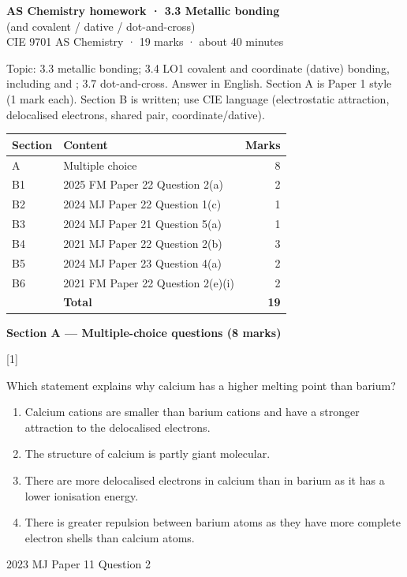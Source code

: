 \documentclass[10pt,a4paper]{article}
\newcommand{\homeworktitle}{Chemistry homework}
\newcommand{\homeworkmarks}{}
\newcommand{\sethomework}[2]{%
  \renewcommand{\homeworktitle}{#1}%
  \renewcommand{\homeworkmarks}{#2}%
}
\newcommand{\qhead}[2]{%
  \par\vspace{0.28em}%
  \Needspace{4.2em}%
  \noindent{\small\textbf{#1}}\hfill{\small[#2]}\par\vspace{0.08em}%
}
\newcommand{\sourcefoot}[1]{%
  {\footnotesize\color{gray}#1}\par
}
\begin{document}
\sethomework{AS Chemistry homework · 3.3 Metallic bonding}{19 marks}

\begin{center}
{\large\bfseries AS Chemistry homework · 3.3 Metallic bonding}\\[0.06em]
{\small (and covalent / dative / dot-and-cross)}\\[0.12em]
{\small CIE 9701 AS Chemistry · 19 marks · about 40 minutes}
\end{center}

{\small Topic: 3.3 metallic bonding; 3.4 LO1 covalent and coordinate (dative) bonding, including  and ; 3.7 dot-and-cross.
Answer in English. Section A is Paper 1 style (1 mark each). Section B is written; use CIE language (electrostatic attraction, delocalised electrons, shared pair, coordinate/dative).}

\vspace{0.15em}
{\small
\begin{tabular}{@{}llr@{}}
\toprule
\textbf{Section} & \textbf{Content} & \textbf{Marks} \\
\midrule
A & Multiple choice & 8 \\
B1 & 2025 FM Paper 22 Question 2(a) & 2 \\
B2 & 2024 MJ Paper 22 Question 1(c) & 1 \\
B3 & 2024 MJ Paper 21 Question 5(a) & 1 \\
B4 & 2021 MJ Paper 22 Question 2(b) & 3 \\
B5 & 2024 MJ Paper 23 Question 4(a) & 2 \\
B6 & 2021 FM Paper 22 Question 2(e)(i) & 2 \\
\midrule
 & \textbf{Total} & \textbf{19} \\
\bottomrule
\end{tabular}}

\vspace{0.25em}
{\large\bfseries Section A --- Multiple-choice questions (8 marks)}\par

\qhead{A1.}{1}
{\small Which statement explains why calcium has a higher melting point than barium?}
\begin{enumerate}[label=\textbf{\Alph*}, leftmargin=1.7em, itemsep=0.08em]
\item Calcium cations are smaller than barium cations and have a stronger attraction to the delocalised electrons.
\item The structure of calcium is partly giant molecular.
\item There are more delocalised electrons in calcium than in barium as it has a lower ionisation energy.
\item There is greater repulsion between barium atoms as they have more complete electron shells than calcium atoms.
\end{enumerate}
\sourcefoot{2023 MJ Paper 11 Question 2}
\end{document}
